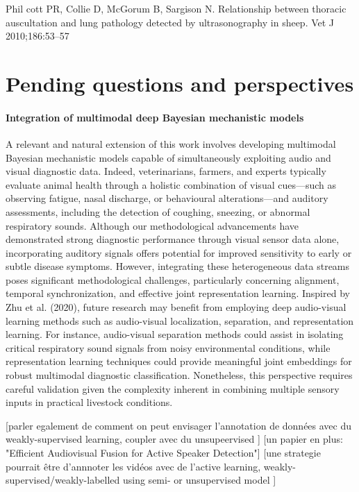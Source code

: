 Phil cott PR, Collie D, McGorum B, Sargison N. Relationship between thoracic auscultation and lung pathology detected by ultrasonography in sheep. Vet J 2010;186:53–57
\section{Pending questions and perspectives}



\paragraph{Integration of multimodal deep Bayesian mechanistic models} A relevant and natural extension of this work involves developing multimodal Bayesian mechanistic models capable of simultaneously exploiting audio and visual diagnostic data. Indeed, veterinarians, farmers, and experts typically evaluate animal health through a holistic combination of visual cues—such as observing fatigue, nasal discharge, or behavioural alterations—and auditory assessments, including the detection of coughing, sneezing, or abnormal respiratory sounds. Although our methodological advancements have demonstrated strong diagnostic performance through visual sensor data alone, incorporating auditory signals offers potential for improved sensitivity to early or subtle disease symptoms. However, integrating these heterogeneous data streams poses significant methodological challenges, particularly concerning alignment, temporal synchronization, and effective joint representation learning. Inspired by Zhu et al. (2020), future research may benefit from employing deep audio-visual learning methods such as audio-visual localization, separation, and representation learning. For instance, audio-visual separation methods could assist in isolating critical respiratory sound signals from noisy environmental conditions, while representation learning techniques could provide meaningful joint embeddings for robust multimodal diagnostic classification. Nonetheless, this perspective requires careful validation given the complexity inherent in combining multiple sensory inputs in practical livestock conditions.
 
[parler egalement de comment on peut envisager l'annotation de données avec du weakly-supervised learning, coupler avec du unsupeervised ]
[un papier en plus: "Efficient Audiovisual Fusion for Active Speaker Detection"]
[une strategie pourrait être d'annnoter les vidéos avec de l'active learning, weakly-supervised/weakly-labelled using semi- or unsupervised model ]

